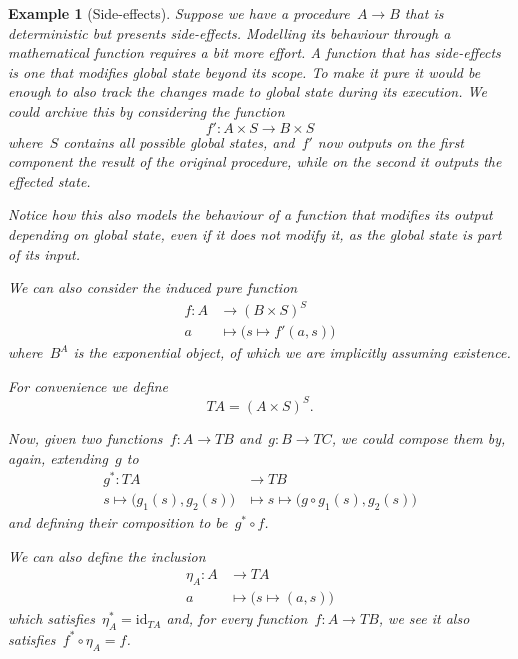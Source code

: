 \documentclass[a4paper]{article}
\theoremstyle{plain}
\newtheorem{example}[theorem]{Example}
\theoremstyle{definition}
\newcommand{\id}{\mathrm{id}}
\begin{document}
\begin{example}[Side-effects]
    Suppose we have a procedure~\(A\longrightarrow B\) that is deterministic but
    presents side-effects. Modelling its behaviour through a mathematical
    function requires a bit more effort. A function that has side-effects is one
    that modifies global state beyond its scope. To make it pure it would be
    enough to also track the changes made to global state during its execution.
    We could archive this by considering the function
    \[
        f':A\times S\longrightarrow B\times S
    \]
    where~\(S\) contains all possible global states, and~\(f'\) now outputs on
    the first component the result of the original procedure, while on the
    second it outputs the effected state.

    Notice how this also models the behaviour of a function that modifies its
    output depending on global state, even if it does not modify it, as the
    global state is part of its input.

    We can also consider the induced pure function
    \begin{align*}
        f:A&\longrightarrow(B\times S)^{S} \\
        a&\longmapsto\bigr(s\mapsto f'(a,s)\bigl)
    \end{align*}
    where~\(B^{A}\) is the exponential object, of which we are implicitly
    assuming existence.

    For convenience we define
    \[
        TA = (A\times S)^{S}.
    \]

    Now, given two functions~\(f:A\longrightarrow TB\)
    and~\(g:B\longrightarrow TC\), we could compose them by, again,
    extending~\(g\) to
    \begin{align*}
        g^{\ast}:TA&\longrightarrow TB \\
        s\mapsto\bigl(g_{1}(s),g_{2}(s)\bigr)&\longmapsto
        s\mapsto\bigl(g\circ g_{1}(s),g_{2}(s)\bigr)
    \end{align*}
    and defining their composition to be~\(g^{\ast} \circ f\).

    We can also define the inclusion
    \begin{align*}
        \eta_{A}:A&\longrightarrow TA \\
        a&\longmapsto\bigl(s\mapsto(a,s)\bigr)
    \end{align*}
    which satisfies~\(\eta_{A}^{\ast}=\id_{TA}\) and, for every
    function~\(f:A\longrightarrow TB\), we see it also
    satisfies~\(f^{\ast}\circ\eta_{A}=f\).
\end{example}
\end{document}
